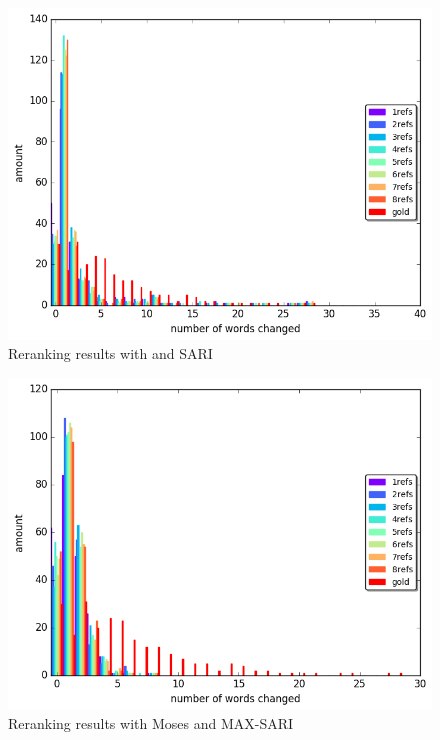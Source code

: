 \documentclass[letterpaper, 11pt]{article}
\begin{document}
\begin{figure}[h!]
	\includegraphics[width=0.9\columnwidth]{nisioi_sari_words_differences_hist}
	\caption{Reranking results with  and SARI}
	
\end{figure}
\begin{figure}[h!]
	\includegraphics[width=0.9\columnwidth]{moses_max_words_differences_hist}
	\caption{Reranking results with Moses and MAX-SARI}
	
\end{figure}
\FloatBarrier
\end{document}
